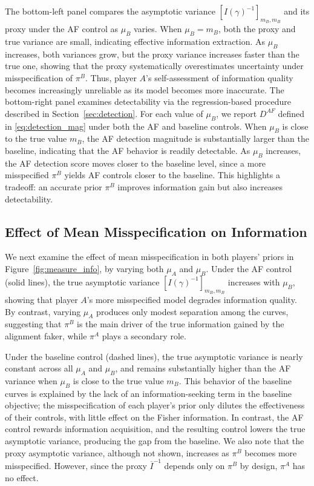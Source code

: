 \documentclass[letterpaper, 10 pt, conference]{ieeeconf}
\begin{document}
The bottom-left panel compares the asymptotic variance $[I(\gamma)^{-1}]_{m_B, m_B}$ and its proxy under the AF control as $\mu_B$ varies.  When $\mu_B = m_B$, both the proxy and true variance are small, indicating effective information extraction.  As $\mu_B$ increases, both variances grow, but the proxy variance increases faster than the true one, showing that the proxy systematically overestimates uncertainty under misspecification of \(\pi^B\). Thus, player \(A\)'s self-assessment of information quality becomes increasingly unreliable as its model becomes more inaccurate. The bottom-right panel examines detectability via the regression-based procedure described in Section~\ref{sec:detection}.  For each value of $\mu_B$, we report $D^{AF}$ defined in \eqref{eq:detection_mag} under both the AF and baseline controls.  When $\mu_B$ is close to the true value $m_B$, the AF detection magnitude is substantially larger than the baseline, indicating that the AF behavior is readily detectable.  As $\mu_B$ increases, the AF detection score moves closer to the baseline level, since a more misspecified $\pi^B$ yields AF controls closer to the baseline.  This highlights a tradeoff: an accurate prior $\pi^B$ improves information gain but also increases detectability.



\subsection{Effect of Mean Misspecification on Information} 
We next examine the effect of mean misspecification in both players' priors in Figure~\ref{fig:measure_info}, by varying both $\mu_A$ and $\mu_B$. Under the AF control (solid lines), the true asymptotic variance $[I(\gamma)^{-1}]_{m_B,m_B}$ increases with $\mu_B$, showing that player $A$'s more misspecified model degrades information quality. By contrast, varying $\mu_A$ produces only modest separation among the curves, suggesting that $\pi^B$ is the main driver of the true information gained by the alignment faker, while \(\pi^A\) plays a secondary role. 

Under the baseline control (dashed lines), the true asymptotic variance is nearly constant across all $\mu_A$ and $\mu_B$, and remains substantially higher than the AF variance when $\mu_B$ is close to the true value $m_B$.  This behavior of the baseline curves is explained by the lack of an information-seeking term in the baseline objective; the misspecification of each player's prior only dilutes the effectiveness of their controls, with little effect on the Fisher information.  In contrast, the AF control rewards information acquisition, and the resulting control lowers the true asymptotic variance, producing the gap from the baseline.  We also note that the proxy asymptotic variance, although not shown, increases as $\pi^B$ becomes more misspecified. However, since the proxy $\overline{I}^{-1}$ depends only on $\pi^B$ by design, $\pi^A$ has no effect.  
\end{document}
